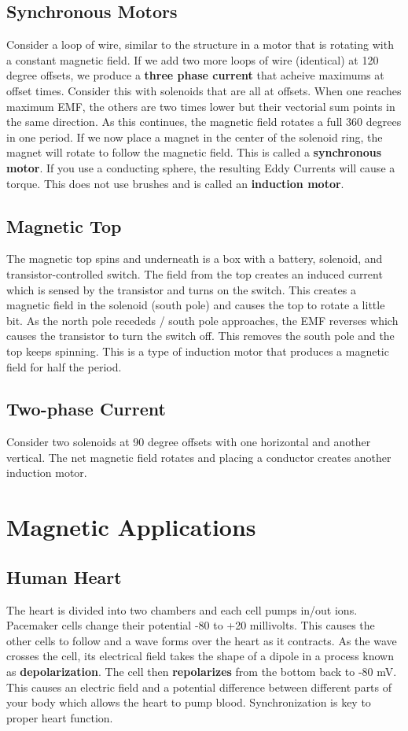 \documentclass{article}
\begin{document}
\subsection{Synchronous Motors}
Consider a loop of wire, similar to the structure in a motor that is rotating with a constant magnetic field.
If we add two more loops of wire (identical) at 120 degree offsets, we produce a \textbf{three phase current} that acheive 
maximums at offset times. Consider this with solenoids that are all at offsets. When one reaches maximum EMF, the others are two times lower but their vectorial sum 
points in the same direction. As this continues, the magnetic field rotates a full 360 degrees in one period.
If we now place a magnet in the center of the solenoid ring, the magnet will rotate to follow the magnetic field.
This is called a \textbf{synchronous motor}. If you use a conducting sphere, the resulting Eddy Currents will cause a torque.
This does not use brushes and is called an \textbf{induction motor}.

\subsection{Magnetic Top}
The magnetic top spins and underneath is a box with a battery, solenoid, and transistor-controlled switch.
The field from the top creates an induced current which is sensed by the transistor and turns on the switch.
This creates a magnetic field in the solenoid (south pole) and causes the top to rotate a little bit. As the north
pole recededs / south pole approaches, the EMF reverses which causes the transistor to turn the switch off. This removes the south pole
and the top keeps spinning. This is a type of induction motor that produces a magnetic field for half the period.

\subsection{Two-phase Current}
Consider two solenoids at 90 degree offsets with one horizontal and another vertical. The net magnetic field 
rotates and placing a conductor creates another induction motor.

\section{Magnetic Applications}
\subsection{Human Heart}
The heart is divided into two chambers and each cell pumps in/out ions.
Pacemaker cells change their potential -80 to +20 millivolts. This causes the other cells to follow and a wave forms over the heart as it contracts.
As the wave crosses the cell, its electrical field takes the shape of a dipole in a process known as \textbf{depolarization}.
The cell then \textbf{repolarizes} from the bottom back to -80 mV. This causes an electric field and a potential difference 
between different parts of your body which allows the heart to pump blood. Synchronization is key to proper heart function.
\end{document}
